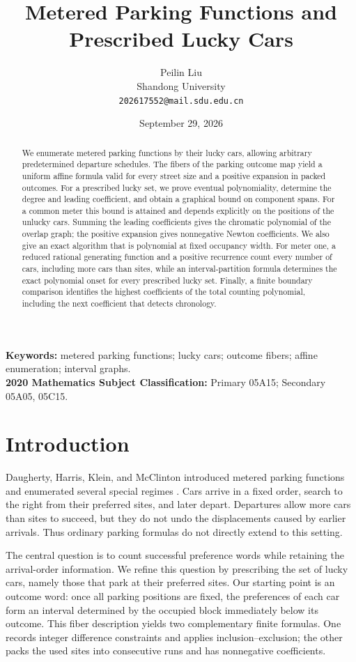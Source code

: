 \documentclass[11pt,a4paper]{article}
\title{Metered Parking Functions and Prescribed Lucky Cars}
\author{Peilin Liu\\\small Shandong University\\\small\texttt{202617552@mail.sdu.edu.cn}}
\date{September 29, 2026}
\begin{document}
\maketitle
\begin{abstract}
We enumerate metered parking functions by their lucky cars, allowing arbitrary predetermined departure schedules. The fibers of the parking outcome map yield a uniform affine formula valid for every street size and a positive expansion in packed outcomes. For a prescribed lucky set, we prove eventual polynomiality, determine the degree and leading coefficient, and obtain a graphical bound on component spans. For a common meter this bound is attained and depends explicitly on the positions of the unlucky cars. Summing the leading coefficients gives the chromatic polynomial of the overlap graph; the positive expansion gives nonnegative Newton coefficients. We also give an exact algorithm that is polynomial at fixed occupancy width. For meter one, a reduced rational generating function and a positive recurrence count every number of cars, including more cars than sites, while an interval-partition formula determines the exact polynomial onset for every prescribed lucky set. Finally, a finite boundary comparison identifies the highest coefficients of the total counting polynomial, including the next coefficient that detects chronology.
\end{abstract}
\noindent\textbf{Keywords:} metered parking functions; lucky cars; outcome fibers; affine enumeration; interval graphs.\\
\textbf{2020 Mathematics Subject Classification:} Primary 05A15; Secondary 05A05, 05C15.

\section{Introduction}
Daugherty, Harris, Klein, and McClinton introduced metered parking functions and enumerated several special regimes \cite{DH}. Cars arrive in a fixed order, search to the right from their preferred sites, and later depart. Departures allow more cars than sites to succeed, but they do not undo the displacements caused by earlier arrivals. Thus ordinary parking formulas do not directly extend to this setting.

The central question is to count successful preference words while retaining the arrival-order information. We refine this question by prescribing the set of lucky cars, namely those that park at their preferred sites. Our starting point is an outcome word: once all parking positions are fixed, the preferences of each car form an interval determined by the occupied block immediately below its outcome. This fiber description yields two complementary finite formulas. One records integer difference constraints and applies inclusion--exclusion; the other packs the used sites into consecutive runs and has nonnegative coefficients.
\end{document}

